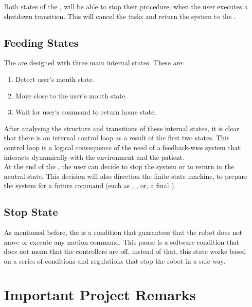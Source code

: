 \documentclass[11pt]{report} %
\begin{document}
Both states of the , will be able to stop their procedure, when the user executes a shutdown transition. This will cancel the tasks and return the system to the .\\


\subsection{Feeding States}

The  are designed with three main internal states. These are:\\

\begin{enumerate}
    \item Detect user's mouth state.
    \item Move close to the user's mouth state.
    \item Wait for user's command to return home state.
\end{enumerate}

After analysing the structure and transitions of these internal states, it is clear that there is an internal control loop as a result of the first two states. This control loop is a logical consequence of the need of a feedback-wise system that interacts dynamically with the environment and the patient.\\

At the end of the , the user can decide to stop the system or to return to the neutral state. This decision will also direction the finite state machine, to prepare the system for a future command (such as , , or, a final ).\\

\subsection{Stop State}

As mentioned before, the  is a condition that guarantees that the robot does not move or execute any motion command. This pause is a software condition that does not mean that the controllers are off, instead of that, this state works based on a series of conditions and regulations that stop the robot in a safe way.\\


\section{Important Project Remarks}
\end{document}
